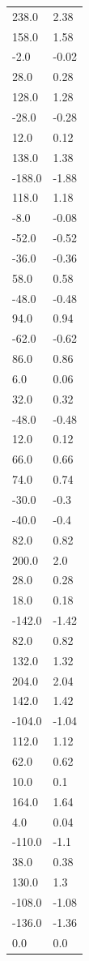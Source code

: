 \begin{longtable}{ll}
238.0 & 2.38 \\
158.0 & 1.58 \\
-2.0 & -0.02 \\
28.0 & 0.28 \\
128.0 & 1.28 \\
-28.0 & -0.28 \\
12.0 & 0.12 \\
138.0 & 1.38 \\
-188.0 & -1.88 \\
118.0 & 1.18 \\
-8.0 & -0.08 \\
-52.0 & -0.52 \\
-36.0 & -0.36 \\
58.0 & 0.58 \\
-48.0 & -0.48 \\
94.0 & 0.94 \\
-62.0 & -0.62 \\
86.0 & 0.86 \\
6.0 & 0.06 \\
32.0 & 0.32 \\
-48.0 & -0.48 \\
12.0 & 0.12 \\
66.0 & 0.66 \\
74.0 & 0.74 \\
-30.0 & -0.3 \\
-40.0 & -0.4 \\
82.0 & 0.82 \\
200.0 & 2.0 \\
28.0 & 0.28 \\
18.0 & 0.18 \\
-142.0 & -1.42 \\
82.0 & 0.82 \\
132.0 & 1.32 \\
204.0 & 2.04 \\
142.0 & 1.42 \\
-104.0 & -1.04 \\
112.0 & 1.12 \\
62.0 & 0.62 \\
10.0 & 0.1 \\
164.0 & 1.64 \\
4.0 & 0.04 \\
-110.0 & -1.1 \\
38.0 & 0.38 \\
130.0 & 1.3 \\
-108.0 & -1.08 \\
-136.0 & -1.36 \\
0.0 & 0.0 \\

\end{longtable}
